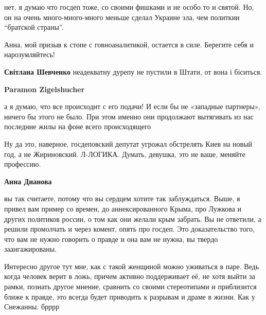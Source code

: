 \begin{itemize}
\begin{itemize}
нет, я думаю что госдеп тоже, со своими фишками и не особо то и святой. Но, он
на очень много-много-много меньше сделал Украине зла, чем политкии \enquote{братской
страны}.

Анна, мой призыв к стопе с говноаналитикой, остается в силе. Берегите себя и нарозумляйтесь!

\textbf{Світлана Шевченко} неадекватну дурепу не пустили в Штати, от вона і біситься.

\textbf{Paramon Zigelshucher} 

а я думаю, что все происходит с его подачи! И если бы не «западные партнеры»,
ничего бы этого не было. При этом именно они продолжают вытягивать из нас
последние жилы на фоне всего происходящего


Ну да это, наверное, госдеповский депутат угрожал обстрелять Киев на новый год,
а не Жириновский. Л-ЛОГИКА. Думать, девушка, это не ваше, меняйте профессию.

\textbf{Анна Дианова}

вы так считаете, потому что вы сердцем хотите так заблуждаться. Выше, я привел
вам пример со времен, до аннексированного Крыма, про Лужкова и других политиков
россии, о том как они желали крым забрать. Вы не ответили, а решили промолчать
и через комент, опять про госдеп. Это доказательство того, что вам не нужно
говорить о правде и она вам не нужна, вы твердо заангажированы.

Интересно другое тут мне, как с такой женщиной можно уживаться в паре. Ведь
когда человек верит в ложь, причем активно поддерживает её, не хотя выйти за
рамки, познать другое мнение, сравнить со своими стереотипами и приблизится
ближе к правде, это всегда будет приводить к разрывам и драме в жизни. Как у
Снежанны. брррр

\end{itemize} %

\end{itemize} %
